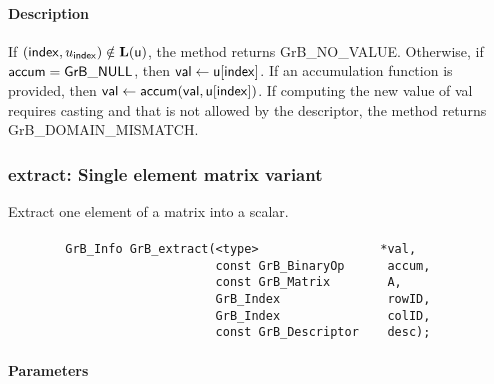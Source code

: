 \paragraph{Description}

If $({\sf index},u_{\sf index}) \notin \bold{L}({\sf u})$, the method returns {\sf GrB\_NO\_VALUE}.
Otherwise, if ${\sf accum} = {\sf GrB\_NULL}$, then ${\sf val} \leftarrow {\sf u}[{\sf index}]$.
If an accumulation function is provided, then ${\sf val} \leftarrow {\sf accum}({\sf val},{\sf u}[{\sf index}])$.
If computing the new value of {\sf val} requires casting and that is not allowed by the descriptor,
the method returns {\sf GrB\_DOMAIN\_MISMATCH}.


\subsubsection{{\sf extract}: Single element matrix variant}
\label{Sec:extract_single_element_mat}


Extract one element of a matrix into a scalar. 

\paragraph{\syntax}

\begin{verbatim}
        GrB_Info GrB_extract(<type>                 *val,
                             const GrB_BinaryOp      accum,
                             const GrB_Matrix        A,
                             GrB_Index               rowID,
                             GrB_Index               colID,
                             const GrB_Descriptor    desc); 

\end{verbatim}

\paragraph{Parameters}

